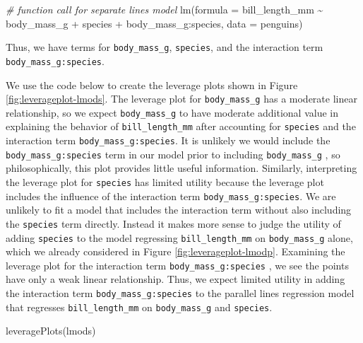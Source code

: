 \documentclass[
]{book}
\newenvironment{Shaded}{\begin{snugshade}}{\end{snugshade}}
\newcommand{\AttributeTok}[1]{\textcolor[rgb]{0.77,0.63,0.00}{#1}}
\newcommand{\CommentTok}[1]{\textcolor[rgb]{0.56,0.35,0.01}{\textit{#1}}}
\newcommand{\FunctionTok}[1]{\textcolor[rgb]{0.00,0.00,0.00}{#1}}
\newcommand{\NormalTok}[1]{#1}
\newcommand{\SpecialCharTok}[1]{\textcolor[rgb]{0.00,0.00,0.00}{#1}}
\theoremstyle{definition}
\theoremstyle{definition}
\theoremstyle{definition}
\theoremstyle{definition}
\theoremstyle{remark}
\begin{document}
\begin{Shaded}
\begin{Highlighting}[]
\CommentTok{\# function call for separate lines model}
\FunctionTok{lm}\NormalTok{(}\AttributeTok{formula =}\NormalTok{ bill\_length\_mm }\SpecialCharTok{\textasciitilde{}}\NormalTok{ body\_mass\_g }\SpecialCharTok{+}\NormalTok{ species }\SpecialCharTok{+}\NormalTok{ body\_mass\_g}\SpecialCharTok{:}\NormalTok{species,}
   \AttributeTok{data =}\NormalTok{ penguins)}
\end{Highlighting}
\end{Shaded}

Thus, we have terms for \texttt{body\_mass\_g}, \texttt{species}, and the interaction
term \texttt{body\_mass\_g:species}.

We use the code below to create the leverage plots shown in Figure
\ref{fig:leverageplot-lmods}. The leverage plot for \texttt{body\_mass\_g} has a
moderate linear relationship, so we expect \texttt{body\_mass\_g} to have
moderate additional value in explaining the behavior of \texttt{bill\_length\_mm}
after accounting for \texttt{species} and the interaction term
\texttt{body\_mass\_g:species}. It is unlikely we would include the
\texttt{body\_mass\_g:species} term in our model prior to including \texttt{body\_mass\_g}
, so philosophically, this plot provides little useful information.
Similarly, interpreting the leverage plot for \texttt{species} has limited
utility because the leverage plot includes the influence of the
interaction term \texttt{body\_mass\_g:species}. We are unlikely to fit a model
that includes the interaction term without also including the \texttt{species}
term directly. Instead it makes more sense to judge the utility of
adding \texttt{species} to the model regressing \texttt{bill\_length\_mm} on
\texttt{body\_mass\_g} alone, which we already considered in Figure
\ref{fig:leverageplot-lmodp}. Examining the leverage plot for the
interaction term \texttt{body\_mass\_g:species} , we see the points have only a
weak linear relationship. Thus, we expect limited utility in adding the
interaction term \texttt{body\_mass\_g:species} to the parallel lines regression
model that regresses \texttt{bill\_length\_mm} on \texttt{body\_mass\_g} and \texttt{species}.

\begin{Shaded}
\begin{Highlighting}[]
\FunctionTok{leveragePlots}\NormalTok{(lmods)}
\end{Highlighting}
\end{Shaded}
\end{document}
